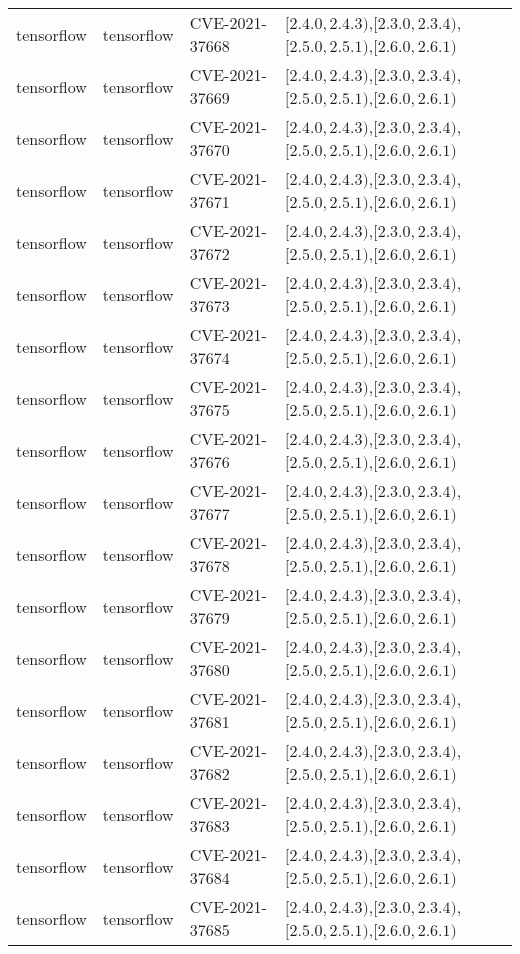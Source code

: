 \begin{tabular}{llll}
tensorflow & tensorflow & CVE-2021-37668 & $[2.4.0,2.4.3)$,$[2.3.0,2.3.4)$,$[2.5.0,2.5.1)$,$[2.6.0,2.6.1)$ \\
tensorflow & tensorflow & CVE-2021-37669 & $[2.4.0,2.4.3)$,$[2.3.0,2.3.4)$,$[2.5.0,2.5.1)$,$[2.6.0,2.6.1)$ \\
tensorflow & tensorflow & CVE-2021-37670 & $[2.4.0,2.4.3)$,$[2.3.0,2.3.4)$,$[2.5.0,2.5.1)$,$[2.6.0,2.6.1)$ \\
tensorflow & tensorflow & CVE-2021-37671 & $[2.4.0,2.4.3)$,$[2.3.0,2.3.4)$,$[2.5.0,2.5.1)$,$[2.6.0,2.6.1)$ \\
tensorflow & tensorflow & CVE-2021-37672 & $[2.4.0,2.4.3)$,$[2.3.0,2.3.4)$,$[2.5.0,2.5.1)$,$[2.6.0,2.6.1)$ \\
tensorflow & tensorflow & CVE-2021-37673 & $[2.4.0,2.4.3)$,$[2.3.0,2.3.4)$,$[2.5.0,2.5.1)$,$[2.6.0,2.6.1)$ \\
tensorflow & tensorflow & CVE-2021-37674 & $[2.4.0,2.4.3)$,$[2.3.0,2.3.4)$,$[2.5.0,2.5.1)$,$[2.6.0,2.6.1)$ \\
tensorflow & tensorflow & CVE-2021-37675 & $[2.4.0,2.4.3)$,$[2.3.0,2.3.4)$,$[2.5.0,2.5.1)$,$[2.6.0,2.6.1)$ \\
tensorflow & tensorflow & CVE-2021-37676 & $[2.4.0,2.4.3)$,$[2.3.0,2.3.4)$,$[2.5.0,2.5.1)$,$[2.6.0,2.6.1)$ \\
tensorflow & tensorflow & CVE-2021-37677 & $[2.4.0,2.4.3)$,$[2.3.0,2.3.4)$,$[2.5.0,2.5.1)$,$[2.6.0,2.6.1)$ \\
tensorflow & tensorflow & CVE-2021-37678 & $[2.4.0,2.4.3)$,$[2.3.0,2.3.4)$,$[2.5.0,2.5.1)$,$[2.6.0,2.6.1)$ \\
tensorflow & tensorflow & CVE-2021-37679 & $[2.4.0,2.4.3)$,$[2.3.0,2.3.4)$,$[2.5.0,2.5.1)$,$[2.6.0,2.6.1)$ \\
tensorflow & tensorflow & CVE-2021-37680 & $[2.4.0,2.4.3)$,$[2.3.0,2.3.4)$,$[2.5.0,2.5.1)$,$[2.6.0,2.6.1)$ \\
tensorflow & tensorflow & CVE-2021-37681 & $[2.4.0,2.4.3)$,$[2.3.0,2.3.4)$,$[2.5.0,2.5.1)$,$[2.6.0,2.6.1)$ \\
tensorflow & tensorflow & CVE-2021-37682 & $[2.4.0,2.4.3)$,$[2.3.0,2.3.4)$,$[2.5.0,2.5.1)$,$[2.6.0,2.6.1)$ \\
tensorflow & tensorflow & CVE-2021-37683 & $[2.4.0,2.4.3)$,$[2.3.0,2.3.4)$,$[2.5.0,2.5.1)$,$[2.6.0,2.6.1)$ \\
tensorflow & tensorflow & CVE-2021-37684 & $[2.4.0,2.4.3)$,$[2.3.0,2.3.4)$,$[2.5.0,2.5.1)$,$[2.6.0,2.6.1)$ \\
tensorflow & tensorflow & CVE-2021-37685 & $[2.4.0,2.4.3)$,$[2.3.0,2.3.4)$,$[2.5.0,2.5.1)$,$[2.6.0,2.6.1)$ \\

\end{tabular}
